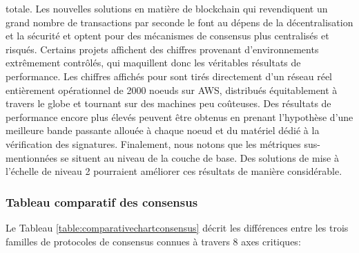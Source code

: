 \documentclass[runningheads]{llncs}
\begin{document}
\begin{itemize}
totale. Les nouvelles solutions en matière de blockchain qui revendiquent un grand nombre de transactions par seconde
le font au dépens de la décentralisation et la sécurité et optent pour des mécanismes de consensus plus centralisés et
risqués. Certains projets affichent des chiffres provenant d'environnements extrêmement contrôlés, qui maquillent donc
les véritables résultats de performance. Les chiffres affichés pour \AVATokenName{} sont tirés directement d'un réseau
\AVAPlatformName{} réel entièrement opérationnel de 2000 noeuds sur AWS, distribués équitablement à travers le globe et
tournant sur des machines peu coûteuses. Des résultats de performance encore plus élevés peuvent être obtenus en prenant
l'hypothèse d'une meilleure bande passante allouée à chaque noeud et du matériel dédié à la vérification des signatures.
Finalement, nous notons que les métriques sus-mentionnées se situent au niveau de la couche de base. Des solutions de
mise à l'échelle de niveau 2 pourraient améliorer ces résultats de manière considérable.
\end{itemize}

\newpage

\subsubsection{Tableau comparatif des consensus}
Le Tableau \ref{table:comparativechartconsensus} décrit les différences entre les trois familles de protocoles de
consensus connues à travers 8 axes critiques:
\end{document}
